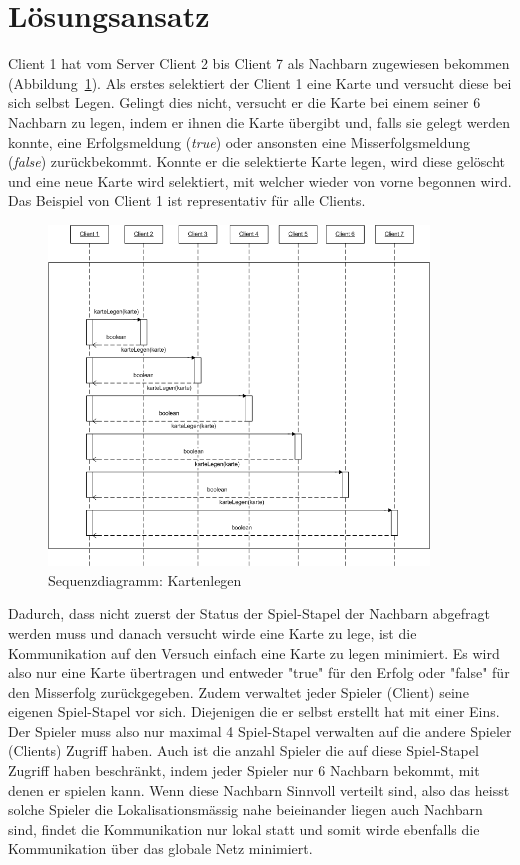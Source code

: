 \section{Lösungsansatz} 

Client 1 hat vom Server Client 2 bis Client 7 als Nachbarn zugewiesen bekommen (Abbildung~\ref{clientkartelegenablauf}). Als erstes selektiert der Client 1 eine Karte und versucht diese bei sich selbst Legen. Gelingt dies nicht, versucht er die Karte bei einem seiner 6 Nachbarn zu legen, indem er ihnen die Karte übergibt und, falls sie gelegt werden konnte, eine Erfolgsmeldung (\textit{true}) oder ansonsten eine Misserfolgsmeldung (\textit{false}) zurückbekommt. Konnte er die selektierte Karte legen, wird diese gelöscht und eine neue Karte wird selektiert, mit welcher wieder von vorne begonnen wird. Das Beispiel von Client 1 ist representativ für alle Clients. 

\begin{figure}[hbt]
  \centering
  \includegraphics[width=0.90\textwidth,angle=0]{graphics/Kartenlegen_Sequenzdiagramm.png}
  \caption{Sequenzdiagramm: Kartenlegen}
  \label{clientkartelegenablauf}
\end{figure}

Dadurch, dass nicht zuerst der Status der Spiel-Stapel der Nachbarn abgefragt werden muss und danach versucht wirde eine Karte zu lege, ist die Kommunikation auf den Versuch einfach eine Karte zu legen minimiert. Es wird also nur eine Karte übertragen und entweder "true" für den Erfolg oder "false" für den Misserfolg zurückgegeben.
Zudem verwaltet jeder Spieler (Client) seine eigenen Spiel-Stapel vor sich. Diejenigen die er selbst erstellt hat mit einer Eins. Der Spieler muss also nur maximal 4 Spiel-Stapel verwalten auf die andere Spieler (Clients) Zugriff haben. 
Auch ist die anzahl Spieler die auf diese Spiel-Stapel Zugriff haben beschränkt, indem jeder Spieler nur 6 Nachbarn bekommt, mit denen er spielen kann. Wenn diese Nachbarn Sinnvoll verteilt sind, also das heisst solche Spieler die Lokalisationsmässig nahe beieinander liegen auch Nachbarn sind, findet die Kommunikation nur lokal statt und somit wirde ebenfalls die Kommunikation über das globale Netz minimiert.

